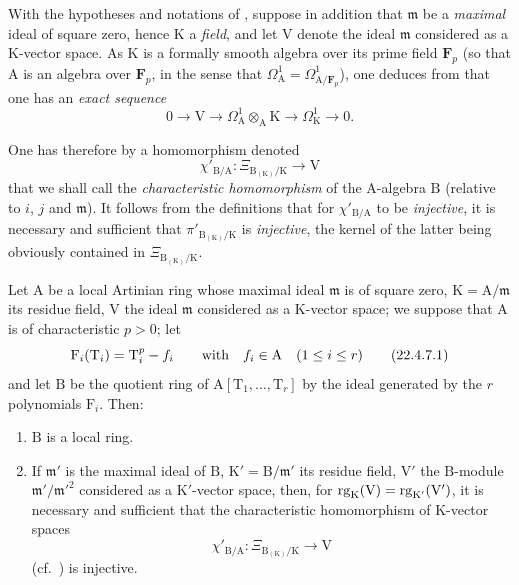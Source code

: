\begin{env}[22.4.6]
\label{0.22.4.6}
With the hypotheses and notations of , suppose in addition that $\mathfrak{m}$ be a \emph{maximal} ideal of square zero, hence $\mathrm{K}$ a \emph{field}, and let $\mathrm{V}$ denote the ideal $\mathfrak{m}$ considered as a $\mathrm{K}$-vector space.
As $\mathrm{K}$ is a formally smooth algebra over its prime field $\mathbf{F}_p$  (so that $\mathrm{A}$ is an algebra over $\mathbf{F}_p$, in the sense that $\Omega^1_\mathrm{A}=\Omega^1_{\mathrm{A}/\mathbf{F}_p}$), one deduces from  that one has an \emph{exact sequence}
\[
\label{0.22.4.6.1}
  0\to\mathrm{V}\to\Omega^1_\mathrm{A}\otimes_\mathrm{A}\mathrm{K}\to\Omega^1_\mathrm{K}\to 0.
  \tag{22.4.6.1}
\]

One has therefore by  a homomorphism denoted
\[
\label{0.22.4.6.2}
  \chi'_{\mathrm{B}/\mathrm{A}}:\Xi_{\mathrm{B}_{(\mathrm{K})}/\mathrm{K}}\to\mathrm{V}
  \tag{22.4.6.2}
\]
that we shall call the \emph{characteristic homomorphism} of the $\mathrm{A}$-algebra $\mathrm{B}$ (relative to $i$, $j$ and $\mathfrak{m}$).
It follows from the definitions that for $\chi'_{\mathrm{B}/\mathrm{A}}$ to be \emph{injective}, it is necessary and sufficient that $\pi'_{\mathrm{B}_{(\mathrm{K})}/\mathrm{K}}$ is \emph{injective}, the kernel of the latter being obviously contained in $\Xi_{\mathrm{B}_{(\mathrm{K})}/\mathrm{K}}$.
\end{env}

\begin{proposition}[22.4.7]
\label{0.22.4.7}
Let $\mathrm{A}$ be a local Artinian ring whose maximal ideal $\mathfrak{m}$ is of square zero, $\mathrm{K}=\mathrm{A}/\mathfrak{m}$ its residue field, $\mathrm{V}$ the ideal $\mathfrak{m}$ considered as a $\mathrm{K}$-vector space; we suppose that $\mathrm{A}$ is of characteristic $p>0$; let
\[
\label{0.22.4.7.1}
  \mathrm{F}_i(\mathrm{T}_i)=\mathrm{T}_i^p- f_i\qquad\text{with}\quad f_i\in\mathrm{A}\quad(1\leq i\leq r)
  \tag{22.4.7.1}
\]
and let $\mathrm{B}$ be the quotient ring of $\mathrm{A}[\mathrm{T}_1,\ldots,\mathrm{T}_r]$ by the ideal generated by the $r$ polynomials $\mathrm{F}_i$.
Then:
\begin{enumerate}
  \item[\rm{(i)}] $\mathrm{B}$ is a local ring.
  \item[\rm{(ii)}] If $\mathfrak{m}'$ is the maximal ideal of $\mathrm{B}$, $\mathrm{K}'=\mathrm{B}/\mathfrak{m}'$ its residue field, $\mathrm{V}'$ the $\mathrm{B}$-module $\mathfrak{m}'/\mathfrak{m}'^2$ considered as a $\mathrm{K}'$-vector space, then, for $\operatorname{rg}_\mathrm{K}(\mathrm{V})=\operatorname{rg}_{\mathrm{K}'}(\mathrm{V}')$, it is necessary and sufficient that the characteristic homomorphism of $\mathrm{K}$-vector spaces
\[
\label{0.22.4.7.2}
  \chi'_{\mathrm{B}/\mathrm{A}}:\Xi_{\mathrm{B}_{(\mathrm{K})}/\mathrm{K}}\to\mathrm{V}
  \tag{22.4.7.2}
\]
  (cf.~) is injective.
\end{enumerate}
\end{proposition}

